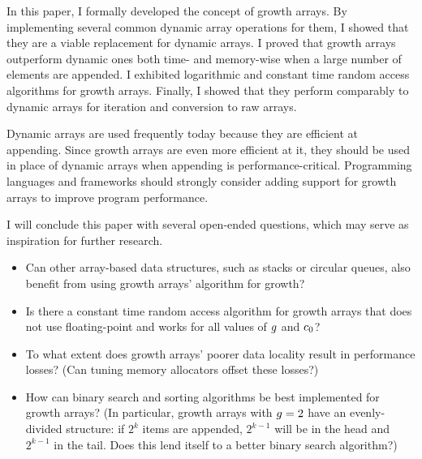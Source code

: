 In this paper, I formally developed the concept of growth arrays. By implementing several common dynamic array operations for them, I showed that they are a viable replacement for dynamic arrays. I proved that growth arrays outperform dynamic ones both time- and memory-wise when a large number of elements are appended. I exhibited logarithmic and constant time random access algorithms for growth arrays. Finally, I showed that they perform comparably to dynamic arrays for iteration and conversion to raw arrays.

Dynamic arrays are used frequently today because they are efficient at appending. Since growth arrays are even more efficient at it, they should be used in place of dynamic arrays when appending is performance-critical. Programming languages and frameworks should strongly consider adding support for growth arrays to improve program performance.

I will conclude this paper with several open-ended questions, which may serve as inspiration for further research.

\begin{itemize}
	\item Can other array-based data structures, such as stacks or circular queues, also benefit from using growth arrays' algorithm for growth?
	\item Is there a constant time random access algorithm for growth arrays that does not use floating-point and works for all values of $g$ and $c_0$?
	\item To what extent does growth arrays' poorer data locality result in performance losses? (Can tuning memory allocators offset these losses?)
	\item How can binary search and sorting algorithms be best implemented for growth arrays? (In particular, growth arrays with $g = 2$ have an evenly-divided structure: if $2^k$ items are appended, $2^{k - 1}$ will be in the head and $2^{k - 1}$ in the tail. Does this lend itself to a better binary search algorithm?)
\end{itemize}